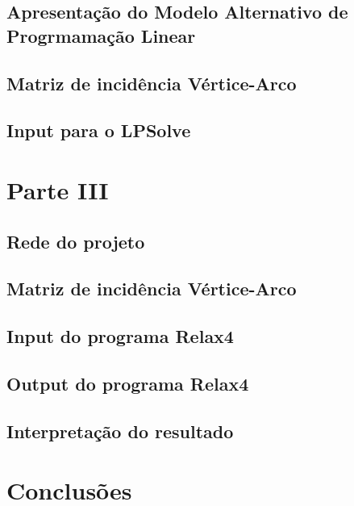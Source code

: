 \documentclass[a4paper]{article}
\begin{document}
\subsection{Apresentação do Modelo Alternativo de Progrmamação Linear}

\par 

\subsection{Matriz de incidência Vértice-Arco}

\par 

\pagebreak
\subsection{Input para o LPSolve}

\par 



\pagebreak
\clearpage
\section{Parte III}
\label{sec:4}

\hspace{3mm}

\subsection{Rede do projeto}

\hspace{3mm} 

\subsection{Matriz de incidência Vértice-Arco}

\subsection{Input do programa Relax4}

\subsection{Output do programa Relax4}


\subsection{Interpretação do resultado}

\hspace{3mm} 


\pagebreak
\section{Conclusões}
\label{sec:5}

\hspace{3mm}  
\end{document}
